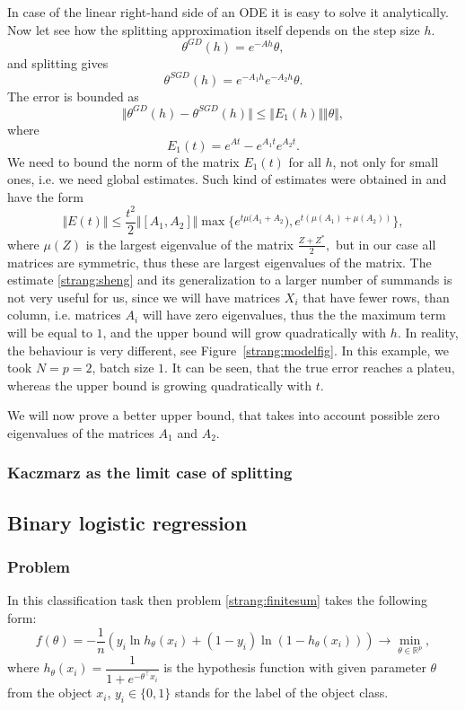 \documentclass{article} %
\begin{document}
In case of the linear right-hand side of an ODE it is easy to solve it analytically. Now let see how the splitting approximation itself depends on the step size $h$.
$$\theta^{GD} (h) = e^{-Ah} \theta, $$
and splitting gives
$$\theta^{SGD}(h) = e^{-A_1 h} e^{-A_2 h} \theta.$$
The error is bounded as
$$
 \Vert \theta^{GD} (h) - \theta^{SGD}(h) \Vert \leq  \Vert E_1(h) \Vert \Vert \theta \Vert,
$$
where
\begin{equation}\label{strang:error}
E_1(t) = e^{A t} - e^{A_1 t} e^{A_2 t}.
\end{equation}
We need to bound the norm of the matrix $E_1(t)$ for all $h$, not only for small ones, i.e. we need global estimates. Such kind of estimates were obtained in \cite{sheng1994global} and have the form
\begin{equation}\label{strang:sheng}
    \Vert E(t) \Vert \leq \frac{t^2}{2} \Vert [ A_1, A_2] \Vert \max \{ e^{t \mu(A_1 + A_2}), e^{t(\mu(A_1) + \mu(A_2))}\},
\end{equation}
where $\mu(Z)$ is the largest eigenvalue of the matrix $\frac{Z+Z^*}{2},$ but in our case all matrices are symmetric, thus these are largest eigenvalues of the matrix. The estimate \eqref{strang:sheng} and its generalization to a larger number of summands is not very useful for us, since we will have matrices $X_i$ that have fewer rows, than column, i.e. matrices $A_i$ will have zero eigenvalues, thus the the maximum term will be equal to $1$, and the upper bound will grow quadratically with $h$. In reality, the behaviour is very different, see Figure~\ref{strang:modelfig}. In this example, we took $N=p=2$, batch size $1$. It can be seen, that the true error reaches a plateu, whereas the upper bound is growing quadratically with $t$.

We will now prove a better upper bound, that takes into account  possible zero eigenvalues of the matrices $A_1$ and $A_2$.


\subsubsection{Kaczmarz as the limit case of splitting}

\subsection{Binary logistic regression}
\subsubsection{Problem}
In this classification task then problem \eqref{strang:finitesum} takes the following form:
\begin{equation}\label{strang:LogReg}
   f(\theta) = -\dfrac{1}{n} \left(y_i \ln h_{\theta}(x_i)  + (1-y_i) \ln (1-h_{\theta}(x_i))\right) \to \min_{\theta \in \mathbb{R}^p},
\end{equation}
where $h_\theta(x_i) = \dfrac{1}{1 + e^{-\theta^\top x_i}}$ is the hypothesis function with given parameter $\theta$ from the object $x_i$, $ y_i \in \{0,1\}$ stands for the label of the object class.
\end{document}
